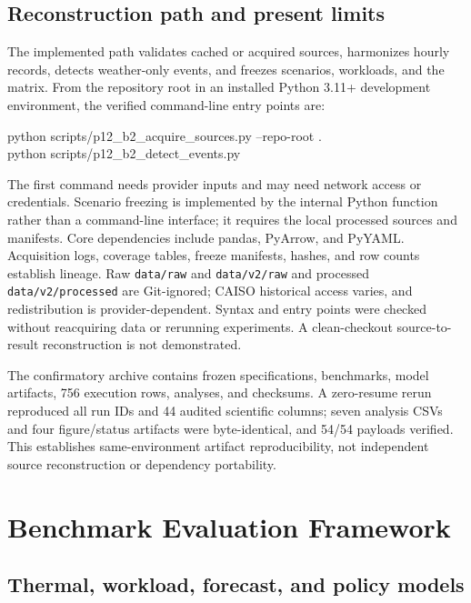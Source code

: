 \documentclass[pdflatex,sn-mathphys-num]{sn-jnl}
\begin{document}
\subsection{Reconstruction path and present limits}

The implemented path validates cached or acquired sources, harmonizes hourly records, detects weather-only events, and freezes scenarios, workloads, and the matrix. From the repository root in an installed Python 3.11+ development environment, the verified command-line entry points are:
\par\smallskip
{\small\ttfamily\noindent
python scripts/p12\_b2\_acquire\_sources.py --repo-root .\\
python scripts/p12\_b2\_detect\_events.py
\par}
\smallskip
The first command needs provider inputs and may need network access or credentials. Scenario freezing is implemented by the internal Python function  rather than a command-line interface; it requires the local processed sources and manifests. Core dependencies include pandas, PyArrow, and PyYAML. Acquisition logs, coverage tables, freeze manifests, hashes, and row counts establish lineage. Raw \texttt{data/raw} and \texttt{data/v2/raw} and processed \texttt{data/v2/processed} are Git-ignored; CAISO historical access varies, and redistribution is provider-dependent. Syntax and entry points were checked without reacquiring data or rerunning experiments. A clean-checkout source-to-result reconstruction is not demonstrated.

The confirmatory archive contains frozen specifications, benchmarks, model artifacts, 756 execution rows, analyses, and checksums. A zero-resume rerun reproduced all run IDs and 44 audited scientific columns; seven analysis CSVs and four figure/status artifacts were byte-identical, and 54/54 payloads verified. This establishes same-environment artifact reproducibility, not independent source reconstruction or dependency portability.

\section{Benchmark Evaluation Framework}\label{sec:framework}

\subsection{Thermal, workload, forecast, and policy models}
\end{document}
